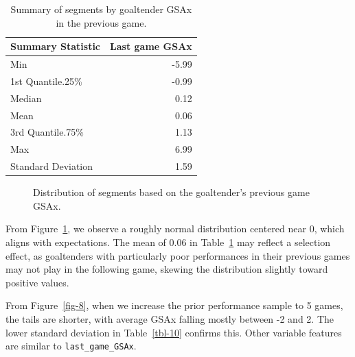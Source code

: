 \documentclass[
  letterpaper,
  DIV=11,
  numbers=noendperiod]{scrartcl}
\begin{document}
\begin{longtable}[]{@{}lr@{}}

\caption{\label{tbl-9}Summary of segments by goaltender GSAx in the
previous game.}

\tabularnewline

\toprule\noalign{}
Summary Statistic & Last game GSAx \\
\midrule\noalign{}
\endhead
\bottomrule\noalign{}
\endlastfoot
Min & -5.99 \\
1st Quantile.25\% & -0.99 \\
Median & 0.12 \\
Mean & 0.06 \\
3rd Quantile.75\% & 1.13 \\
Max & 6.99 \\
Standard Deviation & 1.59 \\

\end{longtable}

\begin{figure}


\caption{\label{fig-7}Distribution of segments based on the goaltender's
previous game GSAx.}

\end{figure}%

From Figure~\ref{fig-7}, we observe a roughly normal distribution
centered near 0, which aligns with expectations. The mean of 0.06 in
Table~\ref{tbl-9} may reflect a selection effect, as goaltenders with
particularly poor performances in their previous games may not play in
the following game, skewing the distribution slightly toward positive
values.

From Figure~\ref{fig-8}, when we increase the prior performance sample
to 5 games, the tails are shorter, with average GSAx falling mostly
between -2 and 2. The lower standard deviation in Table~\ref{tbl-10}
confirms this. Other variable features are similar to
\texttt{last\_game\_GSAx}.
\end{document}

